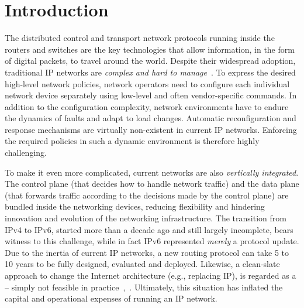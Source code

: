 \section{Introduction}




The distributed control and transport network protocols running inside the 
routers and switches are the key technologies that allow information, 
in the form of digital packets, to travel around the world. Despite 
their widespread adoption, traditional IP networks are \emph{complex and hard to manage}~\cite{benson2009}.
To express the desired high-level network policies, network operators
need to configure each individual network device separately using 
low-level and often vendor-specific commands. In addition to the 
configuration complexity, network environments have to endure the 
dynamics of faults and adapt to load changes. Automatic reconfiguration
and response mechanisms are virtually non-existent in current IP networks.
Enforcing the required policies in such a dynamic environment is therefore
highly challenging.

To make it even more complicated, current networks are also
\emph{vertically integrated}.  The control plane (that decides how to
handle network traffic) and the data plane (that forwards traffic
according to the decisions made by the control plane) are bundled inside
the networking devices, reducing flexibility and hindering innovation
and evolution of the networking infrastructure.  The transition from 
IPv4 to IPv6, started more than a decade ago and still largely incomplete, 
bears witness to this challenge, while in fact IPv6 represented \textit{merely} 
a protocol update. Due to the inertia of current IP networks, a new 
routing protocol can take 5 to 10 years to be fully designed, evaluated and deployed.
Likewise, a clean-slate approach to change the Internet architecture (e.g., 
replacing IP), is regarded as a  -- simply not feasible in practice~\cite{raghavan2012},~\cite{ghodsi2011}. 
Ultimately, this situation has inflated the capital and operational expenses of 
running an IP network.

